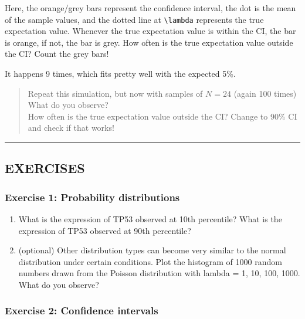 \documentclass[
]{book}
\begin{document}
Here, the orange/grey bars represent the confidence interval, the dot is the mean of the sample values, and the dotted line at \texttt{\textbackslash{}lambda} represents the true expectation value. Whenever the true expectation value is within the CI, the bar is orange, if not, the bar is grey. How often is the true expectation value outside the CI? Count the grey bars!

It happens 9 times, which fits pretty well with the expected 5\%.

\begin{quote}
Repeat this simulation, but now with samples of \(N=24\) (again 100 times)\\
What do you observe?\\
How often is the true expectation value outside the CI? Change to 90\% CI and check if that works!
\end{quote}

\begin{center}\rule{0.5\linewidth}{0.5pt}\end{center}

\hypertarget{exercises-2}{%
\subsection{EXERCISES}\label{exercises-2}}

\hypertarget{exercise-1-probability-distributions}{%
\subsubsection{Exercise 1: Probability distributions}\label{exercise-1-probability-distributions}}

\begin{enumerate}
\def\labelenumi{\arabic{enumi}.}
\item
  What is the expression of TP53 observed at 10th percentile? What is the expression of TP53 observed at 90th percentile?
\item
  (optional) Other distribution types can become very similar to the normal distribution under certain conditions. Plot the histogram of 1000 random numbers drawn from the Poisson distribution with lambda = 1, 10, 100, 1000. What do you observe?
\end{enumerate}

\hypertarget{exercise-2-confidence-intervals}{%
\subsubsection{Exercise 2: Confidence intervals}\label{exercise-2-confidence-intervals}}
\end{document}

